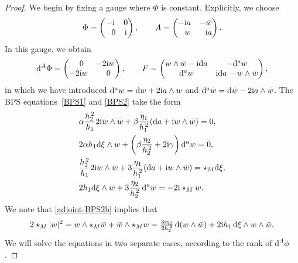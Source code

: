 \documentclass[pdftex]{sigma}
\newcommand{\1}{{\mathbb{1}}}
\def \d{\mathrm{d}}
\numberwithin{equation}{section}
\begin{document}
\begin{proof} We begin by fixing a gauge where $\Phi$ is constant. Explicitly, we choose
\begin{equation}
\label{adjoint-Phi-A}
\Phi=\begin{pmatrix} -{\rm i} & 0 \\ \hphantom{-}0 & {\rm i} \end{pmatrix},\qquad
A = \begin{pmatrix} -{\rm i}a & -\bar{w} \\ \hphantom{-}w & \hphantom{-}{\rm i}a \end{pmatrix}.
\end{equation}
In this gauge, we obtain
\begin{equation}\label{adjoint-dPhi-F}
\d^A\Phi = \begin{pmatrix}\hphantom{-}0 & -2{\rm i}\bar{w} \\ -2{\rm i}w & \hphantom{-}0 \end{pmatrix}, \qquad
F = \begin{pmatrix} w \wedge \bar{w}-{\rm i}\d a & -\d^a\bar{w} \\ \d^a w& {\rm i}\d a - w\wedge\bar{w} \end{pmatrix},
\end{equation}
in which we have introduced $\d^a w = \d w + 2{\rm i}a\wedge w$ and $\d^a \bar{w} = \d \bar{w} - 2{\rm i}a\wedge \bar{w}$. The BPS equations~\eqref{BPS1} and \eqref{BPS2} take the form
\begin{align}
&\alpha \frac{h_2^{\,2}}{h_1}2{\rm i}w\wedge\bar{w} + \beta\frac{\eta_1}{h_1^{\,2}}(\d a+{\rm i}w\wedge\bar{w}) = 0, \label{adjoint-BPS1a}\\
&2\alpha h_1\d\xi\wedge w + \left(\beta\frac{\eta_2}{h_2^{\,2}}+2{\rm i}\gamma\right)\d^a w =0, \label{adjoint-BPS1b}\\
&\frac{h_2^{\,2}}{h_1}2{\rm i}w\wedge\bar{w} + 3\frac{\eta_1}{h_1^{\,2}}(\d a+{\rm i}w\wedge\bar{w}) = \star_{M}\d\xi,\nonumber \\ %
&2 h_1\d\xi\wedge w + 3\frac{\eta_2}{h_2^{\,2}}\,\d^a w =-2{\rm i}\star_{M}w.\label{adjoint-BPS2b}
\end{align}
We note that \eqref{adjoint-BPS2b} implies that{\samepage
\begin{equation}\label{adjoint-BPS3}
2\star_{M}|w|^2 = w\wedge\star_{M}\bar{w}+\bar{w}\wedge\star_{M}w = \tfrac{3{\rm i}\eta_2}{2h_2^{\,2}}\,\d(w \wedge\bar{w})+2{\rm i}h_1\,\d\xi\wedge w\wedge\bar{w}.
\end{equation}
We will solve the equations in two separate cases, according to the rank of $\d^A\phi$.}


\end{proof}
\end{document}
